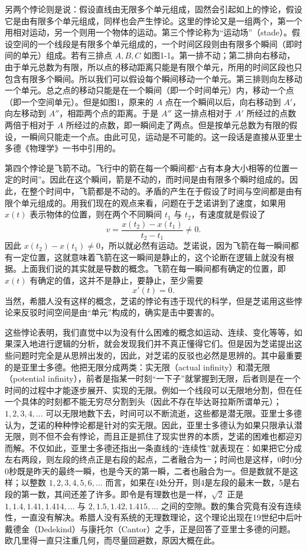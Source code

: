 另两个悖论则是说：假设直线由无限多个单元组成，固然会引起如上的悖论，假设它是由有限多个单元组成，同样也会产生悖论。这里的悖论又是一组两个，第一个用相对运动，另一个则用一个物体的运动。第三个悖论称为“运动场”（stade）。假设空间的一个线段是有限多个单元组成的，一个时间区段则由有限多个瞬间（即时间的单元）组成。若有三排点 $A,B,C$ 如图1-1。第一排不动；第二排向右移动，由于单元总数为有限，所以点的移动距离只能是有限个单元，所用的时间区段也只包含有限多个瞬间。所以我们可以假设每个瞬间移动一个单元。第三排则向左移动一个单元。总之点的移动只能是在一个瞬间（即一个时间单元）内，移动一个点（即一个空间单元）。但是如图1，原来的 $A$ 点在一个瞬间以后，向右移动到 $A'$，向左移动到 $A''$，相距两个点的距离。于是 $A''$ 这一排点相对于 $A'$ 所经过的点数两倍于相对于 $A$ 所经过的点数，即一瞬间走了两点。但是按单元总数为有限的假设，一瞬间只能走一个点。由此可见，运动是不可能的。这一段话是直接从亚里士多德《物理学》一书中引用的。

第四个悖论是飞箭不动。飞行中的箭在每一个瞬间都“占有本身大小相等的位置一定的时间”。因此在这个瞬间，箭是不动的，而时间是由有限多个瞬时组成的。因此，在整个时间中，飞箭都是不动的。矛盾的产生在于假设了时间与空间都是由有限个单元组成的。用我们现在的观点来看，问题在于芝诺讲到了速度，如果用 $x(t)$ 表示物体的位置，则在两个不同瞬间 $t_1$ 与 $t_2$，有速度就是假设了
\[
v=\frac{x(t_2)-x(t_1)}{t_2-t_1}\ne0.
\]
因此 $x(t_2)-x(t_1)\ne0$，所以就必然有运动。芝诺说，因为飞箭在每一瞬间都有一定位置，这就意味着飞箭在这一瞬间是静止的，这个论断在逻辑上就没有根据。上面我们说的其实就是导数的概念。飞箭在每一瞬间都有确定的位置，即 $x(t)$ 有确定的值，这并不是静止，要静止，至少需要
\[
x'(t)=0.
\]
当然，希腊人没有这样的概念，芝诺的悖论有违于现代的科学，但是芝诺用这些悖论来反驳时间空间是由“单元”构成的，确实是击中要害的。

这些悖论表明，我们直觉中以为没有什么困难的概念如运动、连续、变化等等，如果深入地进行逻辑的分析，就会发现我们并不真正懂得它们。但是因为芝诺提出这些问题时完全是从思辨出发的，因此，对芝诺的反驳也必然是思辨的。其中最重要的是亚里士多德。他把无限分成两类：实无限（actual infinity）和潜无限（potential infinity），前者是指某一时刻“一下子”就掌握到无限，后者则是在一个时间的过程中才能逐步展开、实现的无限。例如一个线段可以无限地分割，但在任一个具体的时刻都不能无穷尽分割到头（因此不存在毕达哥拉斯所谓单元）；$1,2,3,4,\ldots$ 可以无限地数下去，时间可以不断流逝，这些都是潜无限。亚里士多德认为，芝诺的种种悖论都是针对的实无限。因此，亚里士多德认为如果只限承认潜无限，则不但不会有悖论，而且正是抓住了现实世界的本质，芝诺的困难也都迎刃而解。不仅如此，亚里士多德还指出一条直线的“连续性”就表现在：如果把它分成左右两段，则左段的终点正是右段的起点，二者融合为一；时间也是这样，0时0分0秒既是昨天的最终一瞬，也是今天的第一瞬，二者也融合为一。但是数就不是这样；以整数 $1,2,3,4,5,6,\ldots$ 而言，如果在4处分开，则4是左段的最末一数，5是右段的第一数，其间还差了许多。即令是有理数也是一样，$\sqrt2$ 正是 $1,1.4,1.41,1.414,\ldots$ 与 $2,1.5,1.42,1.415,\ldots$ 之间的空隙。数的集合究竟有没有连续性，一直没有解决。希腊人没有系统的无理数理论，这个理论出现在19世纪中后叶戴德金（Dedekind）与康托尔（Cantor）之手，正是回答了亚里士多德的问题。欧几里得一直只注重几何，而尽量回避数，原因大概在此。

